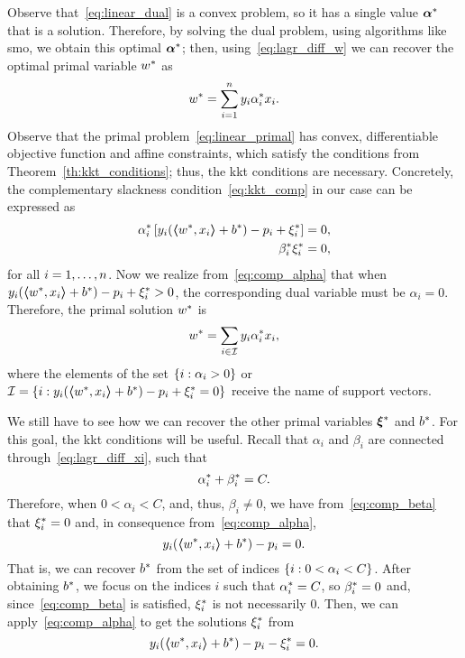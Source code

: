 %
Observe that~\eqref{eq:linear_dual} is a convex problem, so it has a single value ${\bm{\alpha}}^*$ that is a solution. Therefore, by solving the dual problem, using algorithms like \acrshort{smo}, we obtain this optimal ${\bm{\alpha}}^*$; then, using~\eqref{eq:lagr_diff_w} we can recover the optimal primal variable ${w}^*$ as 
\begin{equation}
    \nonumber
    {w}^* = \sum_{i=1}^n y_i {\alpha}^*_i x_i .
\end{equation}
%
Observe that the primal problem~\eqref{eq:linear_primal} has convex, differentiable objective function and affine constraints, which satisfy the conditions from Theorem~\ref{th:kkt_conditions}; thus, the \acrshort{kkt} conditions are necessary.
%
Concretely, the complementary slackness condition~\eqref{eq:kkt_comp} in our case can be expressed as
\begin{align}
    \opt{\alpha}_i \left[ y_i (\dotp{\opt{w}}{x_i} + \opt{b}) - p_i + \opt{\xi}_i \right] = 0 , \label{eq:comp_alpha} \\
    \opt{\beta}_i \opt{\xi}_i = 0 , \label{eq:comp_beta}
\end{align}
for all $i=1, \ldots, n$. 
Now we realize from~\eqref{eq:comp_alpha} that when $y_i (\bm{\left\langle} {w}^*, x_i \bm{\right\rangle} + {b}^*) - p_i + {\xi}^*_i > 0$, the corresponding dual variable must be $\alpha_i = 0$. Therefore, the primal solution ${w}^*$ is 
\begin{equation}
    \nonumber
    {w}^* = \sum_{i \in \mathcal{I}} y_i {\alpha}^*_i x_i ,
\end{equation}
where the elements of the set $\left\{i: \alpha_i > 0\right\}$ or $\mathcal{I} = \left\{i: y_i (\bm{\left\langle} {w}^*, x_i \bm{\right\rangle} + {b}^*) - p_i + {\xi}^*_i = 0\right\}$ receive the name of support vectors.
%

We still have to see how we can recover the other primal variables ${\bm{\xi}}^*$ and ${b}^*$. For this goal, the \acrshort{kkt} conditions will be useful.
Recall that $\alpha_i$ and $\beta_i$ are connected through~\eqref{eq:lagr_diff_xi}, such that 
$$ {\alpha}^*_i + {\beta}^*_i = C .$$
Therefore, when $0 < \alpha_i < C$, and, thus, $\beta_i \neq 0$, we have from~\eqref{eq:comp_beta} that ${\xi}^*_i = 0$ and, in consequence from~\eqref{eq:comp_alpha},
\begin{equation}
    \nonumber
    y_i (\bm{\left\langle} {w}^*, x_i \bm{\right\rangle} + {b}^*) - p_i = 0 .
\end{equation}
That is, we can recover ${b}^*$ from the set of indices $\left\{i: 0 < \alpha_i < C\right\}$.
%
After obtaining ${b}^*$, we focus on the indices $i$ such that ${\alpha}^*_i = C$, so ${\beta}^*_i = 0$ and, since~\eqref{eq:comp_beta} is satisfied, ${\xi}^*_i$ is not necessarily $0$. Then, we can apply~\eqref{eq:comp_alpha} to get the solutions ${\xi}^*_i$ from 
\begin{equation}
    \nonumber
    y_i (\bm{\left\langle} {w}^*, x_i \bm{\right\rangle} + {b}^*) - p_i - {\xi}^*_i = 0 .
\end{equation}

